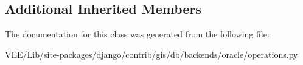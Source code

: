\subsection*{Additional Inherited Members}


The documentation for this class was generated from the following file\+:\begin{DoxyCompactItemize}
\item 
V\+E\+E/\+Lib/site-\/packages/django/contrib/gis/db/backends/oracle/operations.\+py\end{DoxyCompactItemize}
